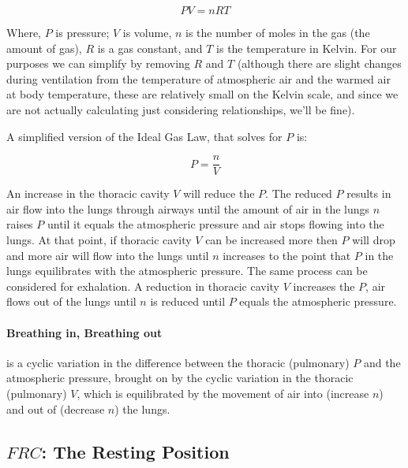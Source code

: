\begin{equation}
    PV = nRT
    \label{ideal_gas}
\end{equation}

Where, $P$ is pressure; $V$ is volume, $n$ is the number of moles in the gas (the amount of gas), $R$ is a gas constant, and $T$ is the temperature in Kelvin. For our purposes we can simplify by removing $R$ and $T$ (although there are slight changes during ventilation from the temperature of atmospheric air and the warmed air at body temperature, these are relatively small on the Kelvin scale, and since we are not actually calculating just considering relationships, we'll be fine).

A simplified version of the Ideal Gas Law, that solves for $P$ is:

\begin{equation}
    P = \frac{n}{V}
\end{equation}

An increase in the thoracic cavity $V$ will reduce the $P$. The reduced $P$ results in air flow into the lungs through airways until the amount of air in the lungs $n$ raises $P$ until it equals the atmospheric pressure and air stops flowing into the lungs. At that point, if thoracic cavity $V$ can be increased more then $P$ will drop and more air will flow into the lungs until $n$ increases to the point that $P$ in the lungs equilibrates with the atmospheric pressure. 
The same process can be considered for exhalation. A reduction in thoracic cavity $V$ increases the $P$, air flows out of the lungs until $n$ is reduced until $P$ equals the atmospheric pressure. 

\paragraph{Breathing in, Breathing out} is a cyclic variation in the difference between the thoracic (pulmonary) $P$ and the atmospheric pressure, brought on by the cyclic variation in the thoracic (pulmonary) $V$, which is equilibrated by the movement of air into (increase $n$) and out of (decrease $n$) the lungs.

\subsection{$FRC$: The Resting Position}

